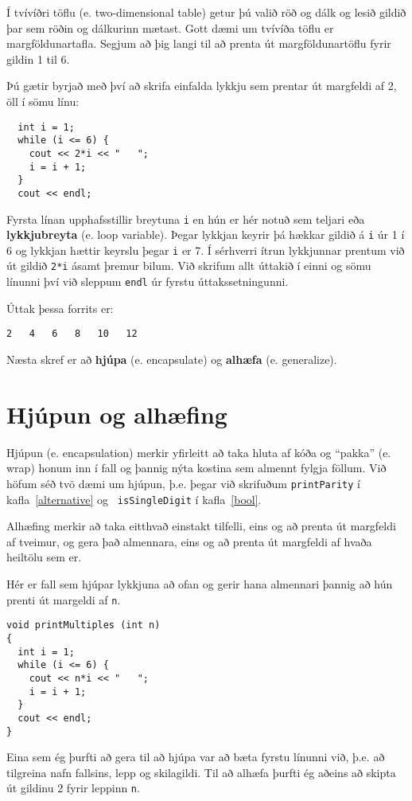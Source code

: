 Í tvívíðri töflu (e. two-dimensional table) getur þú valið röð og dálk og lesið gildið þar sem röðin og dálkurinn mætast.
Gott dæmi um tvívíða töflu er margföldunartafla.
Segjum að þig langi til að prenta út margföldunartöflu fyrir gildin 1 til 6.

Þú gætir byrjað með því að skrifa einfalda lykkju sem prentar út margfeldi af 2, öll í sömu línu:

\begin{verbatim}
  int i = 1;
  while (i <= 6) {
    cout << 2*i << "   ";
    i = i + 1;
  }
  cout << endl;
\end{verbatim}
%
Fyrsta línan upphafsstillir breytuna {\tt i} en hún er hér notuð sem teljari eða {\bf lykkjubreyta} (e. loop variable).
Þegar lykkjan keyrir þá hækkar gildið á {\tt i} úr 1 í 6 og lykkjan hættir keyrslu þegar {\tt i} er 7.
Í sérhverri ítrun lykkjunnar prentum við út gildið {\tt 2*i} ásamt þremur bilum.
Við skrifum allt úttakið í einni og sömu línunni því við sleppum {\tt endl} úr fyrstu úttakssetningunni.


Úttak þessa forrits er:

\begin{verbatim}
2   4   6   8   10   12
\end{verbatim}
%
Næsta skref er að {\bf hjúpa} (e. encapsulate) og {\bf alhæfa} (e. generalize).

\section {Hjúpun og alhæfing}

Hjúpun (e. encapsulation) merkir yfirleitt að taka hluta af kóða og ``pakka'' (e. wrap) honum inn í fall og þannig nýta kostina sem almennt fylgja föllum.
Við höfum séð tvö dæmi um hjúpun, þ.e. þegar við skrifuðum {\tt printParity} í kafla~\ref{alternative} og {\tt
isSingleDigit} í kafla~\ref{bool}.

Alhæfing merkir að taka eitthvað einstakt tilfelli, eins og að prenta út margfeldi af tveimur, og gera það almennara, eins og að prenta út margfeldi af hvaða heiltölu sem er.


Hér er fall sem hjúpar lykkjuna að ofan og gerir hana almennari þannig að hún prenti út margeldi af {\tt n}.

\begin{verbatim}
void printMultiples (int n)
{
  int i = 1;
  while (i <= 6) {
    cout << n*i << "   ";
    i = i + 1;
  }
  cout << endl;
}
\end{verbatim}
%
Eina sem ég þurfti að gera til að hjúpa var að bæta fyrstu línunni við, þ.e. að tilgreina nafn fallsins, lepp og skilagildi.
Til að alhæfa þurfti ég aðeins að skipta út gildinu 2 fyrir leppinn {\tt n}.

